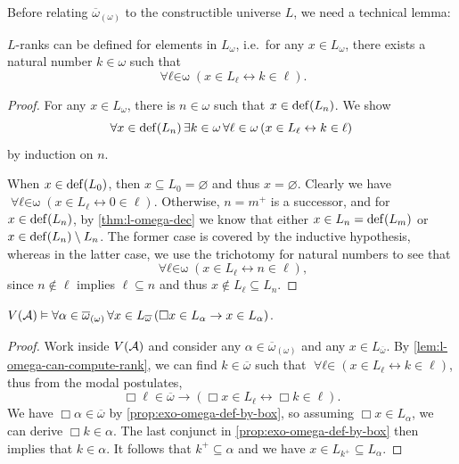\documentclass[12pt,openany]{book}
\theoremstyle{plain}
\theoremstyle{definition}
\newcommand\opA[1]{\mathop{\forall #1}}
\newcommand\opE[1]{\mathop{\exists #1}}
\DeclareMathOperator\dd{def}
\newcommand\IKP{\mathrm{IKP}}
\begin{document}
Before relating $\overline{\omega}_{(\omega)}$ to the constructible universe $L$, we need a technical lemma:

\begin{lemma}[$\IKP$]
  \label{lem:l-omega-can-compute-rank}
  $L$-ranks can be defined for elements in $L_\omega$, i.e.\ for any $x \in L_\omega$, there exists a natural number $k \in \omega$ such that
  \[\opA{\ell \in \omega} \left(x \in L_\ell \leftrightarrow k \in \ell\right).\]
\end{lemma}

\begin{proof}
  For any $x \in L_\omega$, there is $n \in \omega$ such that $x \in \dd\mleft(L_n\mright)$. We show
  \[\opA{x \in \dd\mleft(L_n\mright)} \opE{k \in \omega} \opA{\ell \in \omega} \left(x \in L_\ell \leftrightarrow k \in \ell\right)\]
  by induction on $n$.

  When $x \in \dd\mleft(L_0\mright)$, then $x \subseteq L_0 = \varnothing$ and thus $x = \varnothing$. Clearly we have $\opA{\ell \in \omega} \left(x \in L_\ell \leftrightarrow 0 \in \ell\right)$. Otherwise, $n = m^+$ is a successor, and for $x \in \dd\mleft(L_n\mright)$, by \autoref{thm:l-omega-dec} we know that either $x \in L_n = \dd\mleft(L_m\mright)$ or $x \in \dd\mleft(L_n\mright) \setminus L_n$. The former case is covered by the inductive hypothesis, whereas in the latter case, we use the trichotomy for natural numbers to see that
  \[\opA{\ell \in \omega} \left(x \in L_\ell \leftrightarrow n \in \ell\right),\]
  since $n \not\in \ell$ implies $\ell \subseteq n$ and thus $x \not\in L_\ell \subseteq L_n$.
\end{proof}

\begin{corollary}
  \label{cor:exo-omega-l-compute-witness}
  $V\mleft(\mathcal{A}\mright) \vDash \opA{\alpha \in \overline{\omega}_{(\omega)}} \opA{x \in L_{\overline{\omega}}} \left(\Box x \in L_\alpha \rightarrow x \in L_\alpha\right)$.
\end{corollary}

\begin{proof}
  Work inside $V\mleft(\mathcal{A}\mright)$ and consider any $\alpha \in \overline{\omega}_{(\omega)}$ and any $x \in L_{\overline{\omega}}$. By \autoref{lem:l-omega-can-compute-rank}, we can find $k \in \overline{\omega}$ such that $\opA{\ell \in \overline{\omega}} \left(x \in L_\ell \leftrightarrow k \in \ell\right)$, thus from the modal postulates,
  \[\Box \ell \in \overline{\omega} \rightarrow \left(\Box x \in L_\ell \leftrightarrow \Box k \in \ell\right).\]
  We have $\Box \alpha \in \overline{\omega}$ by \autoref{prop:exo-omega-def-by-box}, so assuming $\Box x \in L_\alpha$, we can derive $\Box k \in \alpha$. The last conjunct in \autoref{prop:exo-omega-def-by-box} then implies that $k \in \alpha$. It follows that $k^+ \subseteq \alpha$ and we have $x \in L_{k^+} \subseteq L_\alpha$.
\end{proof}
\end{document}
